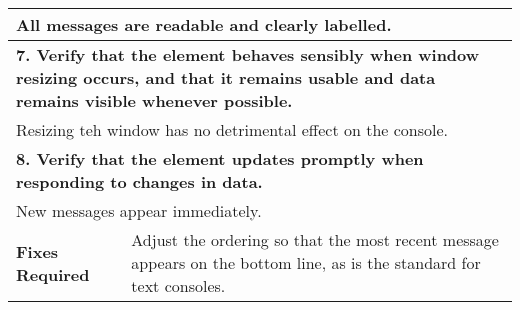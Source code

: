\begin{longtable}{ l p{10cm} }
 \multicolumn{2}{p{14cm}}{All messages are readable and clearly labelled.}\\
 \hline
 \multicolumn{2}{p{14cm}}{\textbf{7. Verify that the element behaves sensibly when window resizing occurs, and that it remains usable and data remains visible whenever possible.}}\\
 \multicolumn{2}{p{14cm}}{Resizing teh window has no detrimental effect on the console.}\\
 \hline
 \multicolumn{2}{p{14cm}}{\textbf{8. Verify that the element updates promptly when responding to changes in data.}}\\
 \multicolumn{2}{p{14cm}}{New messages appear immediately.}\\
 \hline
 \textbf{Fixes Required} & Adjust the ordering so that the most recent message appears on the bottom line, as is the standard for text consoles.\\
 \bottomrule
\end{longtable}
\clearpage

